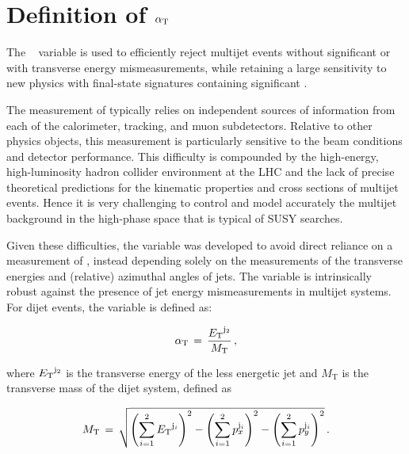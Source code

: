 \section{Definition of $\alpha_{\text{T}}$}
\label{sec:alphatdef}

The \alphat~\cite{Randall:2008rw, CMS:2008vya, CMS-PAS-SUS-09-001} variable is used to
efficiently reject multijet events without significant \met or with
transverse energy mismeasurements, while retaining a large sensitivity
to new physics with final-state signatures containing significant
\met.

The measurement of \met typically relies on independent sources of
information from each of the calorimeter, tracking, and muon
subdetectors. Relative to other physics objects, this
measurement is particularly sensitive to the beam conditions and
detector performance. This difficulty is compounded by the
high-energy, high-luminosity hadron collider environment at the LHC
and the lack of precise theoretical predictions for the kinematic
properties and cross sections of multijet events. Hence it is very
challenging to control and model accurately the multijet background in
the high-\met phase space that is typical of SUSY searches.

Given these difficulties, the variable \alphat was developed to avoid
direct reliance on a measurement of \met, instead depending solely on
the measurements of the transverse energies and (relative) azimuthal
angles of jets. The variable is
intrinsically robust against the presence of jet energy
mismeasurements in multijet systems.\\
For dijet events, the \alphat variable is defined
as:

\begin{equation}
\label{eq:alphat}
\alpha_{\text{T}}\, =\, \frac{{E_{\text T}}^{{\rm j}_2}}{M_\text{T}} \, ,
\end{equation}

where ${E_{\text T}}^{\rm j_2}$ is the transverse energy of the less energetic
jet and $M_\text{T}$ is the transverse mass of the dijet system,
defined as

\begin{equation}
  \label{eq:mt}
  M_\text{T}\, = \,\sqrt{ \left( \sum_{i=1}^2 {E_{\text T}}^{{\rm j}_i}
    \right)^2 - \left( \sum_{i=1}^2 p_x^{{\rm j}_i} \right)^2 - \left(
      \sum_{i=1}^2 p_y^{{\rm j}_i} \right)^2} \, .
\end{equation}

